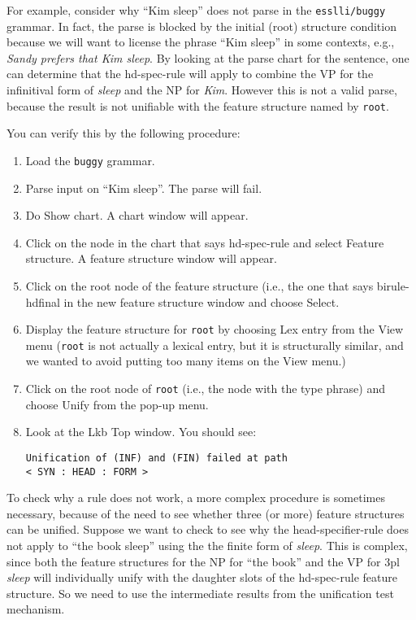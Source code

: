 \documentclass[12pt]{report}
\newcommand{\filename}[1]{{\tt #1}}
\newcommand{\lkbmenucommand}{{\bf}}
\begin{document}
For example, consider why ``Kim sleep'' does not parse in the 
\filename{esslli/buggy}
grammar.  
In fact, the parse is blocked by the initial (root) structure condition
because we will want to license the
phrase ``Kim sleep'' in some contexts, e.g., 
{\it Sandy prefers that Kim sleep}.
By looking at the 
parse chart for the sentence, one can determine that
the hd-spec-rule will apply to combine the VP for
the infinitival form of {\it sleep} and the NP for {\it Kim}.
However this is not a valid parse, because the result is not unifiable with the
feature structure named by {\tt root}.

You can verify this by the following procedure:
\begin{enumerate}
\item Load the \filename{buggy} grammar.
\item {\lkbmenucommand Parse input} on ``Kim sleep''.  The parse will fail.
\item Do {\lkbmenucommand Show chart}.  A chart window will appear.
\item Click on the node in the chart that says hd-spec-rule and 
select {\lkbmenucommand Feature structure}. A feature structure window will
appear.
\item 
Click on the root node of the feature structure (i.e., the one
that says {\type birule-hdfinal} in the 
new feature structure
window and 
choose {\lkbmenucommand Select}.
\item Display the feature structure for {\tt root} by choosing
{\lkbmenucommand Lex entry} from the {\lkbmenucommand View} menu ({\tt root} is not actually a
lexical entry, but it is structurally similar, and we wanted to avoid putting
too many items on the {\lkbmenucommand View} menu.)
\item Click on the root node of {\tt root} (i.e., the node
with the type {\type phrase}) and choose {\lkbmenucommand Unify} from the pop-up menu.
\item Look at the Lkb Top window.  You should see:
\begin{verbatim}
Unification of (INF) and (FIN) failed at path 
< SYN : HEAD : FORM >
\end{verbatim}
\end{enumerate}

To check why a rule does not work, a more complex
procedure is sometimes necessary, because of the need to see whether
three (or more) feature structures can be unified.  
Suppose we want to check to see why the head-specifier-rule
does not apply to ``the book sleep'' using the
the finite form of {\it sleep}. This is 
complex, since both the feature structures for the NP for ``the book'' and
the VP for 3pl {\it sleep} will individually unify with the
daughter slots of the hd-spec-rule feature structure.
So we need to use the intermediate results 
from the unification test mechanism.
\end{document}
